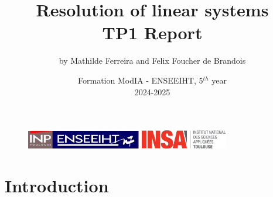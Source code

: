 \documentclass[12pt,a4paper]{article}
\begin{document}
\begin{figure}[t]
    \centering
    \includegraphics[width=5cm]{src/inp_n7.png}
    \hfill
    \includegraphics[width=3.8cm]{src/insa_toulouse.png}
\end{figure}

\title{\vspace{4cm} \textbf{Resolution of linear systems} \\ \vspace{1cm} \textbf{TP1 Report}}

\author{by Mathilde Ferreira and Felix Foucher de Brandois}
        
\date{\vfill Formation ModIA - ENSEEIHT, 5$^{th}$ year \\
2024-2025}

\maketitle
\newpage


\section{Introduction}
\end{document}
